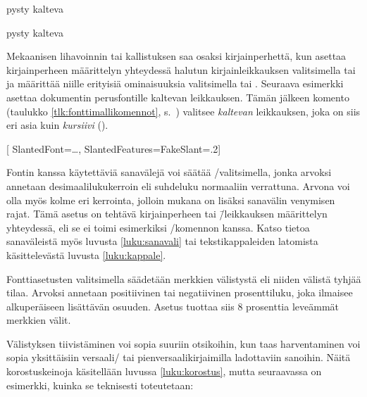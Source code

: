 \begin{koodilohkosis}
  pysty { kalteva}
\end{koodilohkosis}

\begin{tulossis}
  pysty { kalteva}
\end{tulossis}

Mekaanisen lihavoinnin tai kallistuksen saa osaksi kirjainperhettä, kun
asettaa kirjainperheen määrittelyn yhteydessä halutun kirjainleikkauksen
valitsimella  tai  ja määrittää
niille erityisiä ominaisuuksia valitsimella  tai
. Seuraava esimerkki asettaa dokumentin
perusfontille kaltevan leikkauksen. Tämän jälkeen komento  (taulukko \ref{tlk:fonttimallikomennot},
s.~\pageref{tlk:fonttimallikomennot}) valitsee \textsl{kaltevan}
leikkauksen, joka on siis eri asia kuin \textit{kursiivi} ().

\begin{koodilohkosis}
  \setmainfont{…}[
    SlantedFont={…}, %
    SlantedFeatures={FakeSlant=.2}]
\end{koodilohkosis}

Fontin%
 kanssa käytettäviä sanavälejä voi säätää
\-/valitsimella, jonka arvoksi annetaan
desimaalilukukerroin eli suhdeluku normaaliin verrattuna. Arvona voi
olla myös kolme eri kerrointa, jolloin mukana on lisäksi sanavälin
venymisen rajat. Tämä asetus on tehtävä kirjainperheen tai
\=/leikkauksen määrittelyn yhteydessä, eli se ei toimi esimerkiksi
\-/komennon kanssa. Katso tietoa
sanaväleistä myös luvusta \ref{luku:sanavali} tai tekstikappaleiden
latomista käsittelevästä luvusta \ref{luku:kappale}.

Fontti\-asetusten valitsimella%
  säädetään merkkien
välistystä eli niiden välistä tyhjää tilaa. Arvoksi annetaan
positiivinen tai negatiivinen prosenttiluku, joka ilmaisee alkuperäiseen
lisättävän osuuden. Asetus  tuottaa siis 8
prosenttia leveämmät merkkien välit.

Välistyksen tiivistäminen voi sopia suuriin otsikoihin, kun taas
harventaminen voi sopia yksittäisiin versaali\-/{} tai
pienversaalikirjaimilla ladottaviin sanoihin. Näitä korostuskeinoja
käsitellään luvussa \ref{luku:korostus}, mutta seuraavassa on esimerkki,
kuinka se teknisesti toteutetaan:

